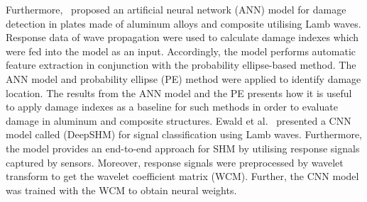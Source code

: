 Furthermore,~\textcite{DeFenza2015} proposed an artificial neural network (ANN) model for damage detection in plates made of aluminum alloys and composite utilising Lamb waves.
Response data of wave propagation were used to calculate damage indexes which were fed into the model as an input.
Accordingly, the model performs automatic feature extraction in conjunction with the probability ellipse-based method. 
The ANN model and probability ellipse (PE) method were applied to identify damage location.
The results from the ANN model and the PE presents how it is useful to apply damage indexes as a baseline for such methods in order to evaluate damage in aluminum and composite structures. 
Ewald et al.~\cite{Ewald2019} presented a CNN model called (DeepSHM) for signal classification using Lamb waves.
Furthermore, the model provides an end-to-end approach for SHM by utilising response signals captured by sensors.
Moreover, response signals were preprocessed by wavelet transform to get the wavelet coefficient matrix (WCM).
Further, the CNN model was trained with the WCM to obtain neural weights.
